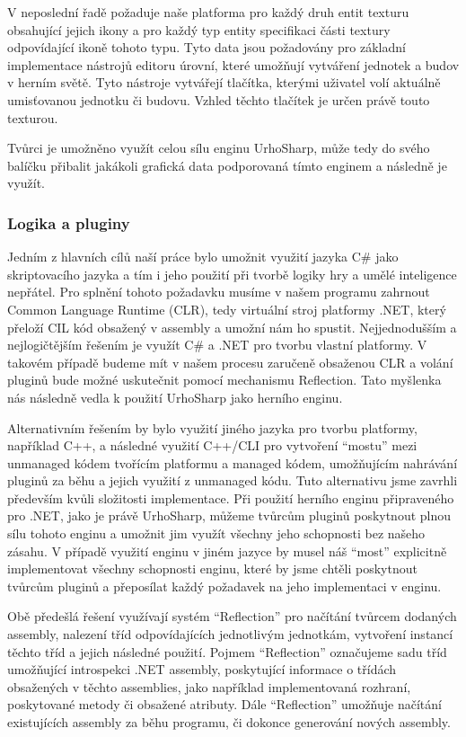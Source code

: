 V neposlední řadě požaduje naše platforma pro každý druh entit texturu obsahující jejich ikony a pro každý typ entity specifikaci části textury odpovídající ikoně tohoto typu. Tyto data jsou požadovány pro základní implementace nástrojů editoru úrovní, které umožňují vytváření jednotek a budov v herním světě. Tyto nástroje vytvářejí tlačítka, kterými uživatel volí aktuálně umisťovanou jednotku či budovu. Vzhled těchto tlačítek je určen právě touto texturou.

Tvůrci je umožněno využít celou sílu enginu UrhoSharp, může tedy do svého balíčku přibalit jakákoli grafická data podporovaná tímto enginem a následně je využít.

\subsubsection{Logika a pluginy}
Jedním z hlavních cílů naší práce bylo umožnit využití jazyka C\# jako skriptovacího jazyka a tím i jeho použití při tvorbě logiky hry a umělé inteligence nepřátel. Pro splnění tohoto požadavku musíme v našem programu zahrnout Common Language Runtime (CLR), tedy virtuální stroj platformy .NET, který přeloží CIL kód obsažený v assembly a umožní nám ho spustit. Nejjednodušším a nejlogičtějším řešením je využít C\# a .NET pro tvorbu vlastní platformy. V takovém případě budeme mít v našem procesu zaručeně obsaženou CLR a volání pluginů bude možné uskutečnit pomocí mechanismu Reflection. Tato myšlenka nás následně vedla k použití UrhoSharp jako herního enginu. 

Alternativním řešením by bylo využití jiného jazyka pro tvorbu platformy, například C++, a následné využití C++/CLI pro vytvoření ``mostu'' mezi unmanaged kódem tvořícím platformu a managed kódem, umožňujícím nahrávání pluginů za běhu a jejich využití z unmanaged kódu. Tuto alternativu jsme zavrhli především kvůli složitosti implementace. Při použití herního enginu připraveného pro .NET, jako je právě UrhoSharp, můžeme tvůrcům pluginů poskytnout plnou sílu tohoto enginu a umožnit jim využít všechny jeho schopnosti bez našeho zásahu. V případě využití enginu v jiném jazyce by musel náš ``most'' explicitně implementovat všechny schopnosti enginu, které by jsme chtěli poskytnout tvůrcům pluginů a přeposílat každý požadavek na jeho implementaci v enginu.

Obě předešlá řešení využívají systém ``Reflection'' pro načítání tvůrcem dodaných assembly, nalezení tříd odpovídajících jednotlivým jednotkám, vytvoření instancí těchto tříd a jejich následné použití. Pojmem ``Reflection'' označujeme sadu tříd umožňující introspekci .NET assembly, poskytující informace o třídách obsažených v těchto assemblies, jako například implementovaná rozhraní, poskytované metody či obsažené atributy. Dále ``Reflection'' umožňuje načítání existujících assembly za běhu programu, či dokonce generování nových assembly. 


